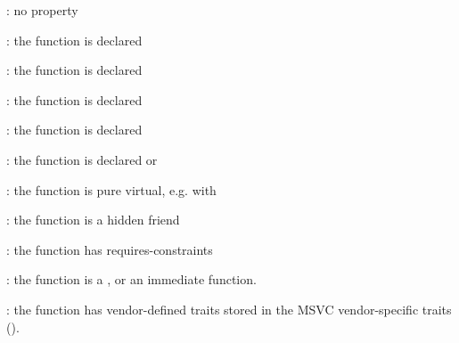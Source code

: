 \begin{description}
	\item {}: no property
	\item {}: the function is declared 
	\item {}: the function is declared 
	\item {}: the function is declared 
	\item {}: the function is declared 
	\item {}: the function is declared \code{[[noreturn]]} or 
	\item {}: the function is pure virtual, e.g. with 
	\item {}: the function is a hidden friend
     \item {} : the function has requires-constraints
     \item {}: the function is a , or an immediate function. 
     \item {}: the function has vendor-defined traits stored in the
	 MSVC vendor-specific traits ().
\end{description}


